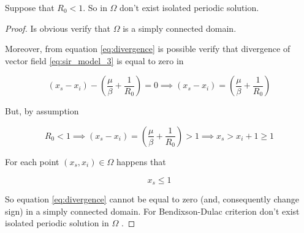 \begin{theorem}
Suppose that $R_0 < 1$. So in $\Omega$ don't exist isolated periodic solution.
\end{theorem}

\begin{proof}
Is obvious verify that $\Omega$ is a simply connected domain.

Moreover, from equation \ref{eq:divergence} is possible verify that divergence of vector field \ref{eq:sir_model_3} is equal to zero in 

\begin{equation}
    (x_s - x_i) - \left(\frac{\mu}{\beta} + \frac{1}{R_0}\right) = 0 \implies (x_s - x_i) = \left(\frac{\mu}{\beta} + \frac{1}{R_0}\right) 
\end{equation}

But, by assumption

\begin{equation}
    R_0 < 1 \implies (x_s - x_i) = \left(\frac{\mu}{\beta} + \frac{1}{R_0}\right) > 1 \implies x_s > x_i + 1 \geq 1
\end{equation}

For each point $\left(x_s,x_i\right) \in \Omega$ happens that 

\begin{equation}
    x_s \leq 1
\end{equation}

So equation \ref{eq:divergence} cannot be equal to zero (and, consequently change sign) in a simply connected domain. For Bendixson-Dulac criterion \cite[pp.~67]{bib:khalil} don't exist isolated periodic solution in $\Omega$ .
\end{proof}